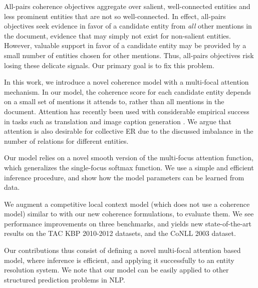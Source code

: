 All-pairs coherence objectives aggregate over salient, well-connected
entities and less prominent entities that are not so well-connected.
In effect, all-pairs objectives seek evidence in favor of a candidate
entity from \emph{all} other mentions in the document, evidence that
may simply not exist for non-salient entities.  However, valuable
support in favor of a candidate entity may be provided by a small
number of entities chosen for other mentions.  Thus, all-pairs
objectives risk losing these delicate signals.  Our primary goal is to
fix this problem.

In this work, we introduce a novel coherence model with a multi-focal
attention mechanism. In our model, the coherence score for each
candidate entity depends on a small set of mentions it attends to,
rather than all mentions in the document. Attention has recently been
used with considerable empirical success in tasks such as translation
\cite{bahdanau2014neural} and image caption generation
\cite{xu2015show}. We argue that attention is also desirable for
collective ER due to the discussed imbalance in the number of
relations for different entities.

Our model relies on a novel smooth version of the multi-focus
attention function, which generalizes the single-focus softmax
function. We use a simple and efficient inference procedure, and show
how the model parameters can be learned from data.

We augment a competitive local context model (which does not use a
coherence model) similar to \cite{Lazic2015} with our new coherence
formulations, to evaluate them.  We see performance improvements on
three benchmarks, and yields new state-of-the-art results on the TAC
KBP 2010-2012 datasets, and the CoNLL 2003 dataset.

Our contributions thus consist of defining a novel multi-focal attention based model, where inference is efficient, and applying it successfully to an entity resolution system. We note that our model can be easily applied to other structured prediction problems in NLP.

